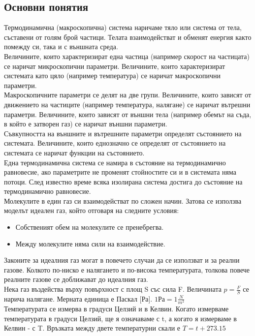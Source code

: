 \documentclass[fleqn, 12pt]{article}
\theoremstyle{definition}
\begin{document}
\subsection{Основни понятия}
Термодинамична (макроскопична) система наричаме тяло или система от тела,
съставени от голям брой частици. Телата взаимодействат и обменят енергия както
помежду си, така и с външната среда.\\
Величините, които характеризират една частица (например скорост на
частицата) се наричат микроскопични параметри. Величините, които характеризират
системата като цяло (например температура) се наричат макроскопични параметри.\\
Макроскопичните параметри се делят на две групи. Величините, които зависят
от движението на частиците (например температура, налягане) се наричат вътрешни
параметри. Величините, които зависят от външни тела (например обемът на съда, в
който е затворен газ) се наричат външни параметри.\\
Съвкупността на външните и вътрешните параметри определят състоянието на
системата. Величините, които еднозначно се определят от състоянието на системата се
наричат функции на състоянието.\\
Една термодинамична система се намира в състояние на термодинамично
равновесие, ако параметрите не променят стойностите си и в системата няма потоци.
След известно време всяка изолирана система достига до състояние на
термодинамично равновесие.\\
Молекулите в един газ си взаимодействат по сложен начин. Затова се използва
моделът идеален газ, който отговаря на следните условия:
\begin{itemize}
\item Собственият обем на молекулите се пренебрегва.
\item Между молекулите няма сили на взаимодействие.
\end{itemize}
Законите за идеалния газ могат в повечето случаи да се използват и за реални
газове. Колкото по-ниско е налягането и по-висока температурата, толкова повече
реалните газове се доближават до идеалния газ.\\
Нека газ въздейства върху повърхност с площ
S със сила F. Величината $p = \frac{F}{S}$ се нарича налягане. Мерната единица е Паскал [Ра]. $1 Ра = 1 \frac{N}{m^2}$ \\
Температурата се измерва в градуси Целзий и в Келвин. Когато измерваме
температурата в градуси Целзий, ще я означаваме с t, а когато я измерваме в Келвин - с T. Връзката между двете температурни скали е $T = t + 273.15$\\
\end{document}
